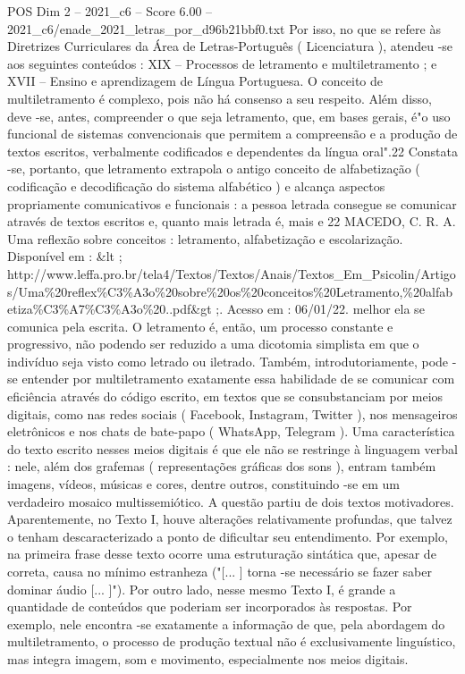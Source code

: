 \begin{textsample}{POS Dim 2 – 2021\_c6 – Score 6.00 – 2021\_c6/enade\_2021\_letras\_por\_d96b21bbf0.txt}
Por isso, no que se refere às Diretrizes Curriculares da Área de Letras-Português ( Licenciatura ), atendeu -se aos seguintes conteúdos : XIX – Processos de letramento e multiletramento ; e XVII – Ensino e aprendizagem de Língua Portuguesa.
O conceito de multiletramento é complexo, pois não há consenso a seu respeito.
Além disso, deve -se, antes, compreender o que seja letramento, que, em bases gerais, é"o uso funcional de sistemas convencionais que permitem a compreensão e a produção de textos escritos, verbalmente codificados e dependentes da língua oral".22 Constata -se, portanto, que letramento extrapola o antigo conceito de alfabetização ( codificação e decodificação do sistema alfabético ) e alcança aspectos propriamente comunicativos e funcionais : a pessoa letrada consegue se comunicar através de textos escritos e, quanto mais letrada é, mais e 22 MACEDO, C.
R.
A.
Uma reflexão sobre conceitos : letramento, alfabetização e escolarização.
Disponível em : \&lt ; http://www.leffa.pro.br/tela4/Textos/Textos/Anais/Textos\_Em\_Psicolin/Artigos/Uma\%20reflex\%C3\%A3o\%20sobre\%20os\%20conceitos\%20Letramento,\%20alfabetiza\%C3\%A7\%C3\%A3o\%20..pdf\&gt ;.
Acesso em : 06/01/22. melhor ela se comunica pela escrita.
O letramento é, então, um processo constante e progressivo, não podendo ser reduzido a uma dicotomia simplista em que o indivíduo seja visto como letrado ou iletrado.
Também, introdutoriamente, pode -se entender por multiletramento exatamente essa habilidade de se comunicar com eficiência através do código escrito, em textos que se consubstanciam por meios digitais, como nas redes sociais ( Facebook, Instagram, Twitter ), nos mensageiros eletrônicos e nos chats de bate-papo ( WhatsApp, Telegram ).
Uma característica do texto escrito nesses meios digitais é que ele não se restringe à linguagem verbal : nele, além dos grafemas ( representações gráficas dos sons ), entram também imagens, vídeos, músicas e cores, dentre outros, constituindo -se em um verdadeiro mosaico multissemiótico.
A questão partiu de dois textos motivadores.
Aparentemente, no Texto I, houve alterações relativamente profundas, que talvez o tenham descaracterizado a ponto de dificultar seu entendimento.
Por exemplo, na primeira frase desse texto ocorre uma estruturação sintática que, apesar de correta, causa no mínimo estranheza ("[... ] torna -se necessário se fazer saber dominar áudio [... ]").
Por outro lado, nesse mesmo Texto I, é grande a quantidade de conteúdos que poderiam ser incorporados às respostas.
Por exemplo, nele encontra -se exatamente a informação de que, pela abordagem do multiletramento, o processo de produção textual não é exclusivamente linguístico, mas integra imagem, som e movimento, especialmente nos meios digitais.

\end{textsample}
